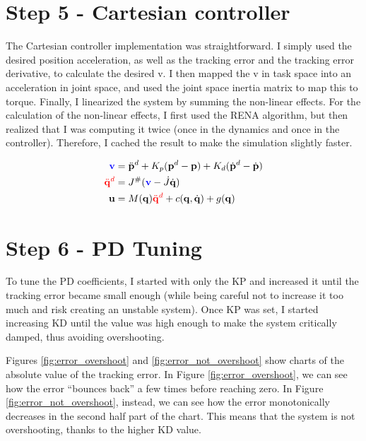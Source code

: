 \documentclass[12pt,a4paper]{article}
\begin{document}
\section{Step 5 - Cartesian controller}

The Cartesian controller implementation was straightforward. I simply used the 
desired position acceleration, as well as the tracking error and the tracking error derivative,
to calculate the desired v. I then mapped the v in task space into an acceleration in 
joint space, and used the joint space inertia matrix to map this to torque.
Finally, I linearized the system by summing the non-linear effects.
For the calculation of the non-linear effects, I first used the RENA algorithm,
but then realized that I was computing it twice (once in the dynamics and once in the controller).
Therefore, I cached the result to make the simulation slightly faster.

\begin{align*}
\textcolor{blue}{\mathbf{v}} &= \ddot{\mathbf{p}}^d + K_p (\mathbf{p}^d - \mathbf{p}) + K_d (\dot{\mathbf{p}}^d - \dot{\mathbf{p}}) \\
\textcolor{red}{\ddot{\mathbf{q}}^d} &= J^\# (\textcolor{blue}{\mathbf{v}} - \dot{J} \dot{\mathbf{q}}) \\
\mathbf{u} &= M(\mathbf{q}) \textcolor{red}{\ddot{\mathbf{q}}^d} + c(\mathbf{q}, \dot{\mathbf{q}}) + g(\mathbf{q})
\end{align*}

\section{Step 6 - PD Tuning}

To tune the PD coefficients, I started with only the KP and increased it until the tracking
error became small enough (while being careful not to increase it too much and risk creating an unstable system).
Once KP was set, I started increasing KD until the value was high enough to make the system critically damped, thus 
avoiding overshooting.

Figures \ref{fig:error_overshoot} and \ref{fig:error_not_overshoot} show charts of the absolute value of the
tracking error. In Figure \ref{fig:error_overshoot}, we can see how the error ``bounces back'' a few times
before reaching zero. In Figure \ref{fig:error_not_overshoot}, instead, we can see how the error monotonically
decreases in the second half part of the chart. This means that the system is not overshooting, thanks 
to the higher KD value.
\end{document}
